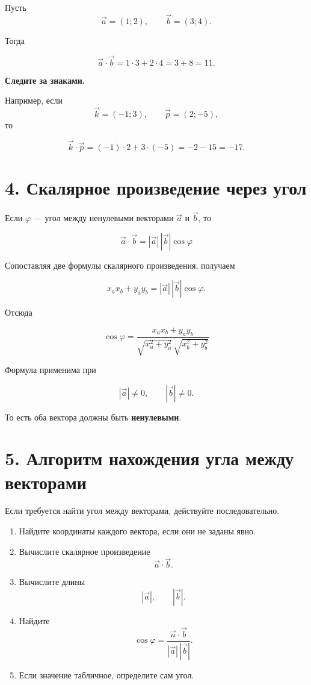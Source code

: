 \documentclass[a4paper,12pt]{article}
\newcommand{\dotprod}{\mathbin{\cdot}}
\begin{document}
Пусть
\[
\vec a=(1;2),
\qquad
\vec b=(3;4).
\]

Тогда

\[
\vec a\dotprod\vec b
=
1\cdot3+2\cdot4
=
3+8
=
11.
\]

\textbf{Следите за знаками.}

Например, если
\[
\vec k=(-1;3),
\qquad
\vec p=(2;-5),
\]
то

\[
\vec k\dotprod\vec p
=
(-1)\cdot2+3\cdot(-5)
=
-2-15
=
-17.
\]


\section*{\color{darkaccent}4. Скалярное произведение через угол}

Если \(\varphi\) --- угол между ненулевыми векторами
\(\vec a\) и \(\vec b\), то

\[
\boxed{
\vec a\dotprod\vec b
=
|\vec a|\,|\vec b|\cos\varphi
}
\]

Сопоставляя две формулы скалярного произведения, получаем

\[
x_a x_b+y_a y_b
=
|\vec a|\,|\vec b|\cos\varphi.
\]

Отсюда

\[
\boxed{
\cos\varphi
=
\frac{x_a x_b+y_a y_b}
{\sqrt{x_a^2+y_a^2}\,
 \sqrt{x_b^2+y_b^2}}
}
\]

Формула применима при

\[
|\vec a|\ne0,
\qquad
|\vec b|\ne0.
\]

То есть оба вектора должны быть \textbf{ненулевыми}.


\section*{\color{darkaccent}5. Алгоритм нахождения угла между векторами}

Если требуется найти угол между векторами, действуйте последовательно.

\begin{enumerate}
    \item Найдите координаты каждого вектора, если они не заданы явно.
    \item Вычислите скалярное произведение
    \[
    \vec a\dotprod\vec b.
    \]
    \item Вычислите длины
    \[
    |\vec a|,
    \qquad
    |\vec b|.
    \]
    \item Найдите
    \[
    \cos\varphi
    =
    \frac{\vec a\dotprod\vec b}
    {|\vec a|\,|\vec b|}.
    \]
    \item Если значение табличное, определите сам угол.
\end{enumerate}
\end{document}
